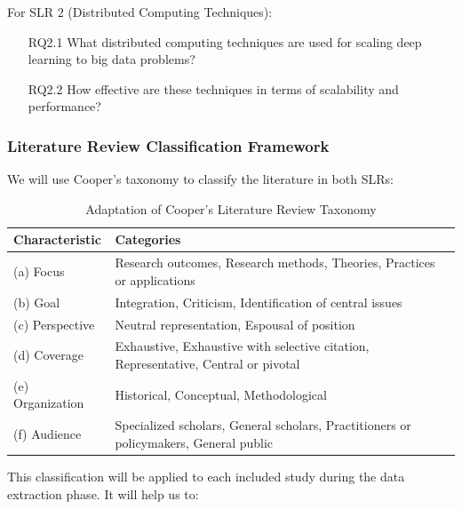\documentclass[acmsmall]{acmart}
\begin{document}
For SLR 2 (Distributed Computing Techniques):
\begin{enumerate}
    \item[RQ2.1] What distributed computing techniques are used for scaling deep learning to big data problems?
    \item[RQ2.2] How effective are these techniques in terms of scalability and performance?
\end{enumerate}

\subsubsection{Literature Review Classification Framework}\label{subsubsec:phase-1-planning-and-protocol-development:literature-review-classification-framework}
We will use Cooper's taxonomy \citep{cooper1988} to classify the literature in both SLRs:

\begin{table}[ht]
    \caption{Adaptation of Cooper's Literature Review Taxonomy}
    \begin{tabularx}{\textwidth}{lX}
        \toprule
        Characteristic   & Categories                                                                            \\
        \midrule
        (a) Focus        & Research outcomes, Research methods, Theories, Practices or applications              \\
        (b) Goal         & Integration, Criticism, Identification of central issues                              \\
        (c) Perspective  & Neutral representation, Espousal of position                                          \\
        (d) Coverage     & Exhaustive, Exhaustive with selective citation, Representative, Central or pivotal    \\
        (e) Organization & Historical, Conceptual, Methodological                                                \\
        (f) Audience     & Specialized scholars, General scholars, Practitioners or policymakers, General public \\
        \bottomrule
    \end{tabularx}
    \label{tab:adaptation-cooper-literature}
\end{table}

This classification will be applied to each included study during the data extraction phase. It will help us to:
\end{document}
